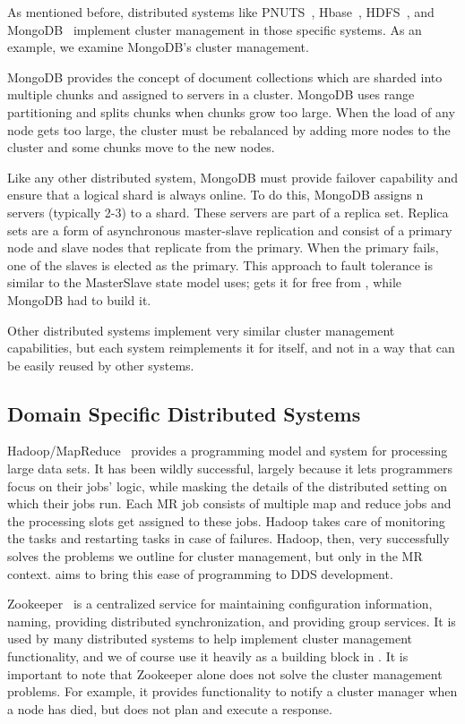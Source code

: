 As mentioned before, distributed systems like PNUTS~\cite{cooper08},
Hbase~\cite{hbase}, HDFS~\cite{hadoop}, and MongoDB~\cite{mongodb} implement 
cluster management in those specific systems. As an example, we examine
MongoDB's cluster management. 

MongoDB provides the concept of document collections which are sharded into
multiple chunks and assigned to servers in a cluster. MongoDB uses range
partitioning and splits chunks when chunks grow too large. When the load of any
node gets too large, the cluster must be rebalanced by adding more nodes to the
cluster and some chunks move to the new nodes.

Like any other distributed system, MongoDB must provide failover capability and
ensure that a logical shard is always online. To do this, MongoDB assigns n
servers (typically 2-3) to a shard. These servers are part of a replica set.
Replica sets are a form of asynchronous master-slave replication and consist of
a primary node and slave nodes that replicate from the primary. When the primary
fails, one of the slaves is elected as the primary.  This approach to fault
tolerance is similar to the MasterSlave state model \ES uses; \ES gets it for
free from \helix, while MongoDB had to build it.

Other distributed systems implement very similar cluster management
capabilities, but each system reimplements it for itself, and not in a way that
can be easily reused by other systems. 

\subsection{Domain Specific Distributed Systems}

Hadoop/MapReduce~\cite{hadoop,dean04} provides a programming model and
system for 
processing large data sets. It has been wildly successful, largely because it
lets programmers focus on their jobs' logic, while masking the details of the
distributed setting on which their jobs run.  Each MR job consists of multiple map and reduce jobs 
and the processing slots get assigned to these jobs. Hadoop takes care of monitoring 
the tasks and restarting tasks in case of failures.  Hadoop, then, very
successfully solves the problems we outline for cluster management, but only in
the MR context.  \helix aims to bring this ease of programming to DDS
development.

Zookeeper~\cite{zookeeper} is a centralized service for maintaining configuration information, 
naming, providing distributed synchronization, and providing group services. 
It is used by many distributed systems to help implement cluster management
functionality, and we of course use it heavily as a building block in \helix.  It is important to
note that Zookeeper alone does not solve the cluster management problems.  For
example, it provides functionality to notify a cluster manager when a node has
died, but does not plan and execute a response. 

